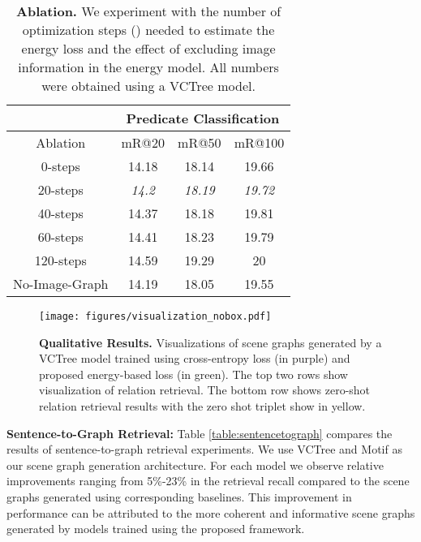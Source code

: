 \documentclass[final]{cvpr}
\begin{document}
\renewcommand{\arraystretch}{1.05}
\begin{table}[t]
\centering
\begin{tabular}{@{}cccc@{}}
\toprule
\toprule
                                    & \multicolumn{3}{c}{Predicate Classification} \\ \midrule
\multicolumn{1}{c|}{Ablation}       & mR@20         & mR@50        & mR@100        \\ \midrule
\multicolumn{1}{c|}{0-steps}        & 14.18         & 18.14        & 19.66         \\
\multicolumn{1}{c|}{20-steps}       & \emph{14.2}          & \emph{18.19}        & \emph{19.72}         \\
\multicolumn{1}{c|}{40-steps}       & 14.37         & 18.18        & 19.81         \\
\multicolumn{1}{c|}{60-steps}       & 14.41         & 18.23        & 19.79         \\
\multicolumn{1}{c|}{120-steps}      & 14.59         & 19.29        & 20            \\ \midrule
\multicolumn{1}{c|}{No-Image-Graph} & 14.19         & 18.05        & 19.55         \\ \bottomrule
\bottomrule
\end{tabular}
\caption{\textbf{Ablation.} We experiment with the number of optimization steps () needed to estimate the energy loss and the effect of excluding image information in the energy model. All numbers were obtained using a VCTree \cite{tang2019learning} model.}
\label{table:ablation}
\vspace{-0.15in}
\end{table}
\begin{figure*}[t]
    \centering
    \texttt{[image: figures/visualization\_nobox.pdf]}
    \vspace{-0.23in}
    \caption{\textbf{Qualitative Results.} Visualizations of scene graphs generated by a VCTree \cite{tang2019learning} model trained using cross-entropy loss (in purple) and proposed energy-based loss (in green). The top two rows show visualization of relation retrieval. The bottom row shows zero-shot relation retrieval results with the zero shot triplet show in yellow.}
    \label{fig:qulaitative_results}
    \vspace{-0.1in}
\end{figure*}

\vspace{0.06in}
\noindent
{\bf Sentence-to-Graph Retrieval:}
Table \ref{table:sentencetograph} compares the results of sentence-to-graph retrieval experiments. We use VCTree and Motif as our scene graph generation architecture. For each model we observe relative improvements ranging from 5\%-23\% in the retrieval recall compared to the scene graphs generated using corresponding baselines. 
This improvement in performance can be attributed to the more coherent and informative scene graphs generated by models trained using the proposed framework.
\end{document}
